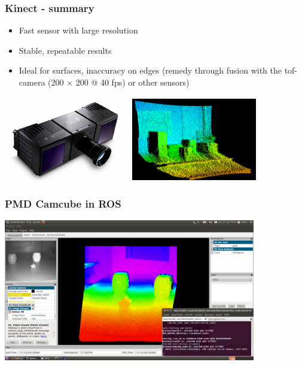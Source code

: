 \begin{frame}
 \frametitle{Kinect - summary}
\begin{itemize}
  \item Fast sensor with large resolution
  \item Stable, repeatable results
  \item Ideal for surfaces, inaccuracy on edges (remedy through fusion with the tof-camera (200 $\times$ 200 @ 40 fps) or other sensors)
\end{itemize}
\hspace{3ex}\includegraphics[width=5.5cm]{img/camcube.png}
\includegraphics[width=5.5cm]{img/pmd2.png}
\end{frame}

\begin{frame}
 \frametitle{PMD Camcube in ROS}
\includegraphics[width=11cm]{img/camcube_ros.png}
\end{frame}


